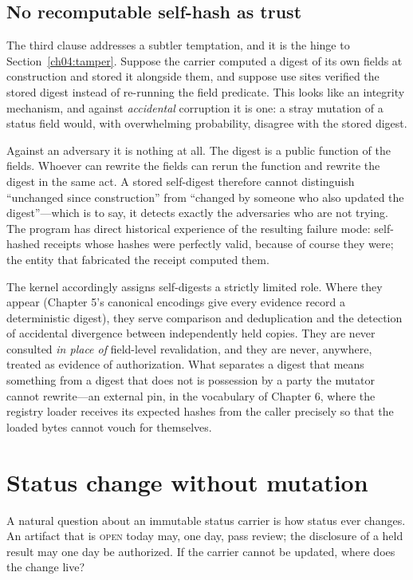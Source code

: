 \subsection{No recomputable self-hash as trust}

The third clause addresses a subtler temptation, and it is the hinge to
Section~\ref{ch04:tamper}. Suppose the carrier computed a digest of its own
fields at construction and stored it alongside them, and suppose use sites
verified the stored digest instead of re-running the field predicate. This
looks like an integrity mechanism, and against \emph{accidental} corruption
it is one: a stray mutation of a status field would, with overwhelming
probability, disagree with the stored digest.

Against an adversary it is nothing at all. The digest is a public function
of the fields. Whoever can rewrite the fields can rerun the function and
rewrite the digest in the same act. A stored self-digest therefore cannot
distinguish ``unchanged since construction'' from ``changed by someone who
also updated the digest''---which is to say, it detects exactly the
adversaries who are not trying. The program has direct historical experience
of the resulting failure mode: self-hashed receipts whose hashes were
perfectly valid, because of course they were; the entity that fabricated the
receipt computed them.

The kernel accordingly assigns self-digests a strictly limited role. Where
they appear (Chapter 5's canonical encodings give every evidence record a
deterministic digest), they serve comparison and deduplication and the
detection of accidental divergence between independently held copies. They
are never consulted \emph{in place of} field-level revalidation, and they are
never, anywhere, treated as evidence of authorization. What separates a
digest that means something from a digest that does not is possession by a
party the mutator cannot rewrite---an external pin, in the vocabulary of
Chapter 6, where the registry loader receives its expected hashes from the
caller precisely so that the loaded bytes cannot vouch for themselves.

\section{Status change without mutation}\label{ch04:lifecycle}

A natural question about an immutable status carrier is how status ever
changes. An artifact that is \textsc{open} today may, one day, pass
review; the disclosure of a held result may one day be authorized. If
the carrier cannot be updated, where does the change live?

